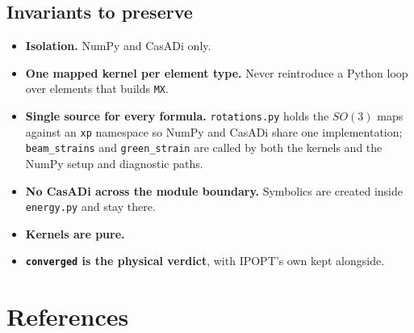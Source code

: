 \documentclass[11pt,a4paper]{article}
\newcommand{\code}[1]{\texttt{\small #1}}
\begin{document}
\subsection{Invariants to preserve}

\begin{itemize}
\item \textbf{Isolation.} NumPy and CasADi only.
\item \textbf{One mapped kernel per element type.} Never reintroduce a Python
loop over elements that builds \code{MX}.
\item \textbf{Single source for every formula.} \code{rotations.py} holds the
$SO(3)$ maps against an \code{xp} namespace so NumPy and CasADi share one
implementation; \code{beam\_strains} and \code{green\_strain} are called by both
the kernels and the NumPy setup and diagnostic paths.
\item \textbf{No CasADi across the module boundary.} Symbolics are created inside
\code{energy.py} and stay there.
\item \textbf{Kernels are pure.}
\item \textbf{\code{converged} is the physical verdict}, with IPOPT's own kept
alongside.
\end{itemize}

\section*{References}
\end{document}
